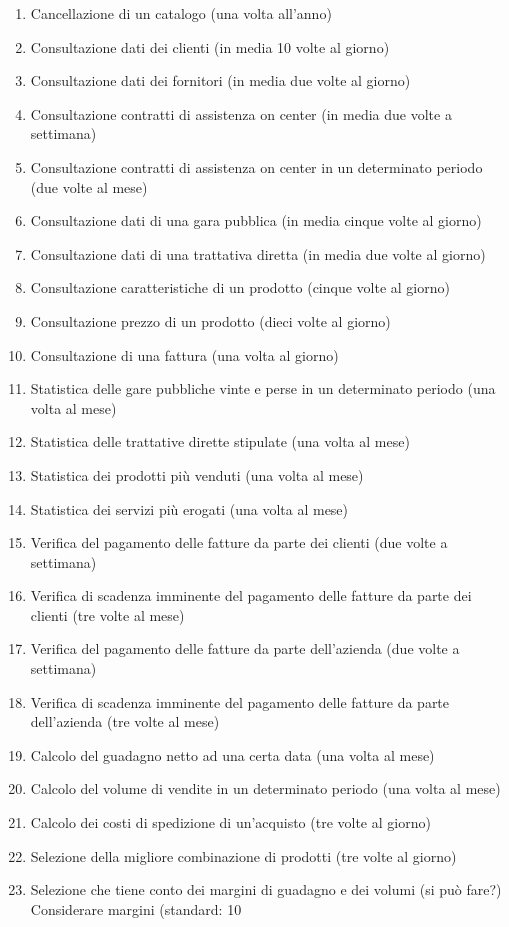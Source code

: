 \begin{enumerate}
  \item Cancellazione di un catalogo (una volta all'anno)
  \item Consultazione dati dei clienti (in media 10 volte al giorno)
  \item Consultazione dati dei fornitori (in media due volte al giorno)
  \item Consultazione contratti di assistenza on center (in media due volte a settimana)
  \item Consultazione contratti di assistenza on center in un determinato periodo (due volte al mese)
  \item Consultazione dati di una gara pubblica (in media cinque volte al giorno)
  \item Consultazione dati di una trattativa diretta (in media due volte al giorno)
  \item Consultazione caratteristiche di un prodotto (cinque volte al giorno)
  \item Consultazione prezzo di un prodotto (dieci volte al giorno)
  \item Consultazione di una fattura (una volta al giorno)
  \item Statistica delle gare pubbliche vinte e perse in un determinato periodo (una volta al mese)
  \item Statistica delle trattative dirette stipulate (una volta al mese)
  \item Statistica dei prodotti più venduti (una volta al mese)
  \item Statistica dei servizi più erogati (una volta al mese)
  \item Verifica del pagamento delle fatture da parte dei clienti (due volte a settimana)
  \item Verifica di scadenza imminente del pagamento delle fatture da parte dei clienti (tre volte al mese)
  \item Verifica del pagamento delle fatture da parte dell'azienda (due volte a settimana)
  \item Verifica di scadenza imminente del pagamento delle fatture da parte dell'azienda (tre volte al mese)
  \item Calcolo del guadagno netto ad una certa data (una volta al mese)
  \item Calcolo del volume di vendite in un determinato periodo (una volta al mese)
  \item Calcolo dei costi di spedizione di un'acquisto (tre volte al giorno)
  \item Selezione della migliore combinazione di prodotti (tre volte al giorno)
  \item Selezione che tiene conto dei margini di guadagno e dei volumi (si può fare?) Considerare margini (standard: 10%

\end{enumerate}
